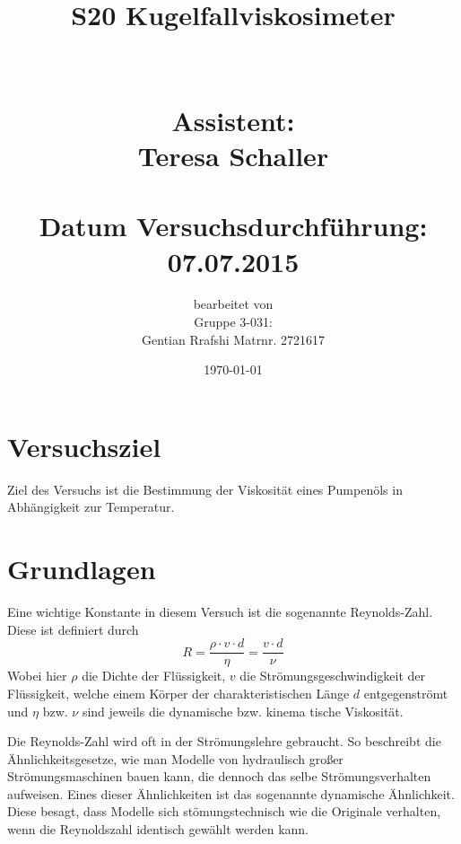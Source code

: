 \documentclass[fontsize=12pt]{scrartcl}
\begin{document}
\begin{minipage}{0.9\textwidth}
\begin{center}\large
\title{ S20 Kugelfallviskosimeter \\
		~\\
		~\\
		Assistent: \\ Teresa Schaller \\
		~\\
		Datum Versuchsdurchführung: \\
		07.07.2015}

\author{bearbeitet von\\
		Gruppe 3-031: \\
		Gentian Rrafshi Matrnr. 2721617 }
\date{\today}

\maketitle

\end{center}
\end{minipage}

\newpage

\tableofcontents

\newpage
\noindent

\section{ Versuchsziel}

Ziel des Versuchs ist die Bestimmung der Viskosität eines Pumpenöls in Abhängigkeit zur Temperatur.

\section{ Grundlagen}

Eine wichtige Konstante in diesem Versuch ist die sogenannte Reynolds-Zahl. Diese ist definiert durch 
\begin{equation*}
R=\frac{\rho\cdot v\cdot d}{\eta} = \frac{v\cdot d}{\nu}
\end{equation*}
Wobei hier $\rho$ die Dichte der Flüssigkeit, $v$ die Strömungsgeschwindigkeit der Flüssigkeit, welche einem Körper der charakteristischen Länge $d$ entgegenströmt und $\eta$ bzw. $\nu$ sind jeweils die dynamische bzw. kinema	tische Viskosität. \par

Die Reynolds-Zahl wird oft in der Strömungslehre gebraucht. So beschreibt die \\ Ähnlichkeitsgesetze, wie man Modelle von hydraulisch großer 
Strömungsmaschinen bauen kann, die dennoch das selbe Strömungsverhalten aufweisen. Eines dieser Ähnlichkeiten ist das sogenannte dynamische 
Ähnlichkeit. Diese besagt, dass Modelle sich stömungstechnisch wie die Originale verhalten, wenn die Reynoldszahl identisch gewählt werden kann.\par
\end{document}
